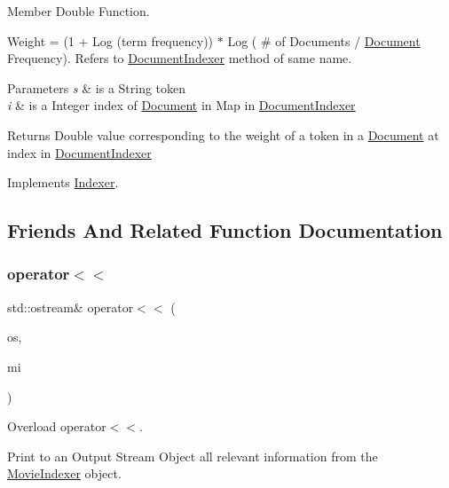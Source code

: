 Member Double Function. 

Weight = (1 + Log (term frequency)) $\ast$ Log ( \# of Documents / \hyperlink{class_document}{Document} Frequency). Refers to \hyperlink{class_document_indexer}{Document\+Indexer} method of same name.


\begin{DoxyParams}{Parameters}
{\em s} & is a String token \\
\hline
{\em i} & is a Integer index of \hyperlink{class_document}{Document} in Map in \hyperlink{class_document_indexer}{Document\+Indexer} \\
\hline
\end{DoxyParams}
\begin{DoxyReturn}{Returns}
Double value corresponding to the weight of a token in a \hyperlink{class_document}{Document} at index in \hyperlink{class_document_indexer}{Document\+Indexer} 
\end{DoxyReturn}


Implements \hyperlink{class_indexer_a8301fcbdf40afd926ab71d4767575d32}{Indexer}.



\subsection{Friends And Related Function Documentation}
\mbox{\label{class_movie_indexer_ac341c6cedb7cda66713cf4bdd0fb8d72}} 
\subsubsection{\texorpdfstring{operator$<$$<$}{operator<<}}
{\footnotesize\ttfamily std\+::ostream\& operator$<$$<$ (\begin{DoxyParamCaption}\item[{std\+::ostream \&}]{os,  }\item[{const \hyperlink{class_movie_indexer}{Movie\+Indexer} \&}]{mi }\end{DoxyParamCaption})\hspace{0.3cm}{\ttfamily [friend]}}



Overload operator$<$$<$. 

Print to an Output Stream Object all relevant information from the \hyperlink{class_movie_indexer}{Movie\+Indexer} object.


